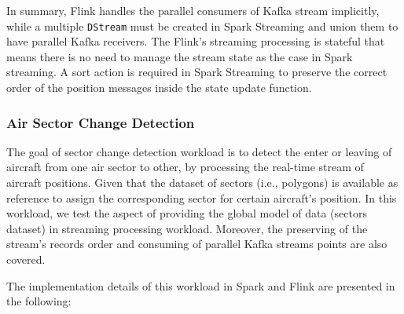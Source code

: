 \documentclass[]{article}
\begin{document}
\begin{itemize}
\end{itemize}

\par In summary, Flink  handles  the parallel consumers of Kafka stream implicitly, while a multiple \texttt{DStream} must be created in Spark Streaming and union them to have parallel Kafka receivers. The Flink's streaming processing is stateful that means there is no need to manage the stream state as the case in Spark streaming. A sort action is required in Spark Streaming to preserve the correct  order of the position messages inside the state update function.

\subsubsection{Air Sector Change Detection}

The goal of sector change detection workload is to detect the  enter or leaving of aircraft from one air sector to other, by processing the real-time stream of aircraft positions. Given that the dataset of sectors (i.e., polygons) is available as reference to assign the corresponding sector for certain aircraft's position. In this workload, we test the aspect of providing the  global model of data (sectors dataset) in streaming processing workload. Moreover, the preserving of the stream's records order and consuming of parallel Kafka streams points are also covered.
 
 The implementation details of this workload in Spark and Flink are presented in the following: 
 
\end{document}
